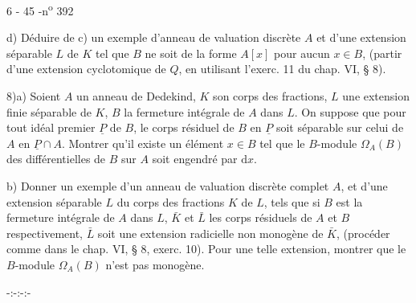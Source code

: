 \begin{center}6 - 45 -\hfill n\textsuperscript{o} 392\end{center}

d) Déduire de c) un exemple d'anneau de valuation discrète $A$ et d'une extension séparable $L$ de $K$ tel que $B$ ne soit de la forme $A[x]$ pour aucun $x\in B$, (partir d'une extension cyclotomique de $Q$, en utilisant l'exerc. 11 du chap. VI, § 8).

8)\quad a) Soient $A$ un anneau de Dedekind, $K$ son corps des fractions, $L$ une extension finie séparable de $K$, $B$ la fermeture intégrale de $A$ dans $L$. On suppose que pour tout idéal premier $\underline P$ de $B$, le corps résiduel de $B$ en $\underline P$ soit séparable sur celui de $A$ en $\underline P\cap A$. Montrer qu'il existe un élément $x\in B$ tel que le $B$-module $\Omega_A(B)$ des différentielles de $B$ sur $A$ soit engendré par $\mathrm{d}x$.

b) Donner un exemple d'un anneau de valuation discrète complet $A$, et d'une extension séparable $L$ du corps des fractions $K$ de $L$, tels que si $B$ est la fermeture intégrale de $A$ dans $L$, $\bar K$ et $\bar L$ les corps résiduels de $A$ et $B$ respectivement, $\bar L$ soit une extension radicielle non monogène de $\bar K$, (procéder comme dans le chap. VI, § 8, exerc. 10). Pour une telle extension, montrer que le $B$-module $\Omega_A(B)$ n'est pas monogène.

\begin{center}-:-:-:-\end{center}
